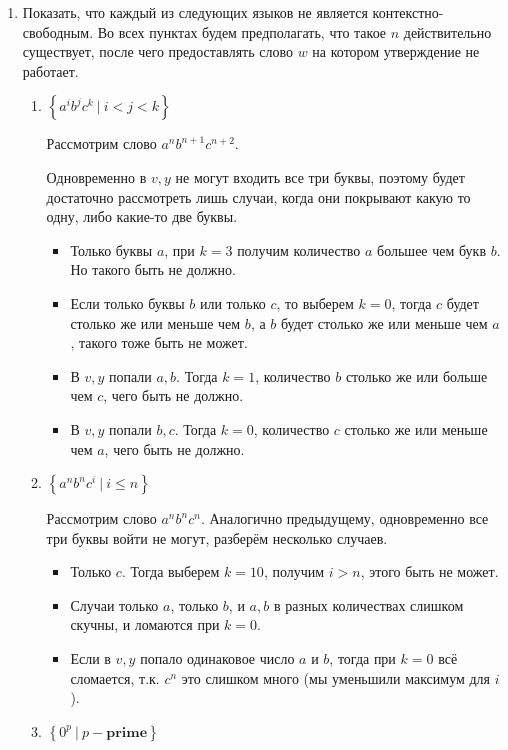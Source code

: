 \documentclass[fleqn]{article}
\begin{document}
\begin{enumerate}

\item Показать, что каждый из следующих языков не является контекстно-свободным. Во всех пунктах будем 
предполагать, что такое $n$ действительно существует, после чего предоставлять слово $w$ на котором утверждение не 
работает.
	\begin{enumerate}
		\item $\left\{ a^ib^jc^k   \ | \ i < j < k \right\}$
		
		Рассмотрим слово $a^n b^{n + 1} c^{n + 2}$.
		
		Одновременно в $v, y$ не могут входить все три буквы, поэтому будет достаточно рассмотреть лишь случаи, когда 
		они покрывают какую то одну, либо какие-то две буквы.
		
		\begin{itemize}
			\item Только буквы $a$, при $k = 3$ получим количество $a$ большее чем букв $b$. Но такого быть не должно.
			\item Если только буквы $b$ или только $c$, то выберем $k = 0$, тогда $c$ будет столько же или меньше чем 
			$b$, а $b$ будет столько же или меньше чем $a$, такого тоже быть не может.
			\item В $v, y$ попали $a, b$. Тогда $k = 1$, количество $b$ столько же или больше чем $c$, чего быть не должно.
			\item В $v, y$ попали $b, c$. Тогда $k = 0$, количество $c$ столько же или меньше чем $a$, чего быть не должно.
		\end{itemize}
		\item $\left\{ a^nb^nc^i   \ | \ i \leq n \right\}$
		
		Рассмотрим слово $a^n b^n c^n$.
		Аналогично предыдущему, одновременно все три буквы войти не могут, разберём несколько случаев.
		\begin{itemize}
			\item Только $c$. Тогда выберем $k = 10$, получим $i > n$, этого быть не может.
			\item Случаи только $a$, только $b$, и $a, b$ в разных количествах слишком скучны, и ломаются при $k = 0$.
			\item Если в $v, y$ попало одинаковое число $a$ и $b$, тогда при $k = 0$ всё сломается, т.к. $c^n$ это слишком много (мы уменьшили максимум для $i$).
		\end{itemize}
		
		
		\item $\left\{ 0^p         \ | \ p - \mathbf{prime} \right\}$
		

\end{enumerate}
\end{enumerate}
\end{document}

